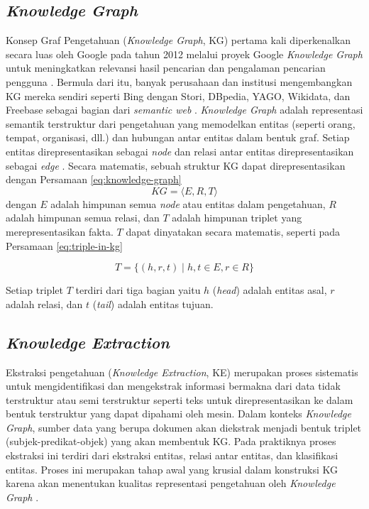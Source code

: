 \subsection{\textit{Knowledge Graph}}
Konsep Graf Pengetahuan (\textit{Knowledge Graph}, KG) pertama kali diperkenalkan secara luas oleh Google pada tahun 2012 melalui proyek Google \textit{Knowledge Graph} untuk meningkatkan relevansi hasil pencarian dan pengalaman pencarian pengguna \cite{Singhal2012IntroducingKnowledgeGraph}.
Bermula dari itu, banyak perusahaan dan institusi mengembangkan KG mereka sendiri seperti Bing dengan Stori, DBpedia, YAGO, Wikidata, dan Freebase sebagai bagian dari \textit{semantic web} \cite{Paulheim2016KnowledgeGraphSurvei}.
\textit{Knowledge Graph} adalah representasi semantik terstruktur dari pengetahuan yang memodelkan entitas (seperti orang, tempat, organisasi, dll.) dan hubungan antar entitas dalam bentuk graf.
Setiap entitas direpresentasikan sebagai \textit{node} dan relasi antar entitas direpresentasikan sebagai \textit{edge} \cite{Chen2020ReviewKnowldgeReasoningOverKnowledgeGraph}.
Secara matematis, sebuah struktur KG dapat direpresentasikan dengan Persamaan \ref{eq:knowledge-graph}
\begin{equation}
	\text{$KG$} = \langle E, R, T \rangle
	\label{eq:knowledge-graph}
\end{equation}%
dengan $E$ adalah himpunan semua \textit{node} atau entitas dalam pengetahuan, $R$ adalah himpunan semua relasi, dan $T$ adalah himpunan triplet yang merepresentasikan fakta.
$T$ dapat dinyatakan secara matematis, seperti pada Persamaan \ref{eq:triple-in-kg}

\begin{equation}
	T = \{(h,r,t) \mid h,t \in E, r \in R\}
	\label{eq:triple-in-kg}
\end{equation}

Setiap triplet $T$ terdiri dari tiga bagian yaitu $h$ (\textit{head}) adalah entitas asal, $r$ adalah relasi, dan $t$ (\textit{tail}) adalah entitas tujuan.

\subsection{\textit{Knowledge Extraction}}
Ekstraksi pengetahuan (\textit{Knowledge Extraction}, KE) merupakan proses sistematis untuk mengidentifikasi dan mengekstrak informasi bermakna dari data tidak terstruktur atau semi terstruktur seperti teks untuk direpresentasikan ke dalam bentuk terstruktur yang dapat dipahami oleh mesin.
Dalam konteks \textit{Knowledge Graph}, sumber data yang berupa dokumen akan diekstrak menjadi bentuk triplet (subjek-predikat-objek) yang akan membentuk KG.
Pada praktiknya proses ekstraksi ini terdiri dari ekstraksi entitas, relasi antar entitas, dan klasifikasi entitas.
Proses ini merupakan tahap awal yang krusial dalam konstruksi KG karena akan menentukan kualitas representasi pengetahuan oleh \textit{Knowledge Graph} \cite{Choi2025KnowledgeGraphConstruction}.

